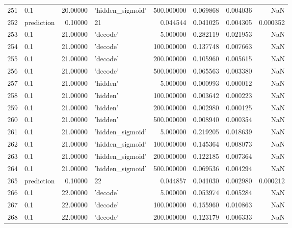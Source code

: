 \documentclass[10pt,a4paper]{article}
\begin{document}
\begin{tabular}{llrlrrrr}
251  &         0.1 &  20.00000 &   'hidden\_sigmoid' &  500.000000 &  0.069868 &  0.004036 &       NaN \\
252  &  prediction &   0.10000 &                 21 &    0.044544 &  0.041025 &  0.004305 &  0.000352 \\
253  &         0.1 &  21.00000 &           'decode' &    5.000000 &  0.282119 &  0.021953 &       NaN \\
254  &         0.1 &  21.00000 &           'decode' &  100.000000 &  0.137748 &  0.007663 &       NaN \\
255  &         0.1 &  21.00000 &           'decode' &  200.000000 &  0.105960 &  0.005615 &       NaN \\
256  &         0.1 &  21.00000 &           'decode' &  500.000000 &  0.065563 &  0.003380 &       NaN \\
257  &         0.1 &  21.00000 &           'hidden' &    5.000000 &  0.000993 &  0.000012 &       NaN \\
258  &         0.1 &  21.00000 &           'hidden' &  100.000000 &  0.003642 &  0.000223 &       NaN \\
259  &         0.1 &  21.00000 &           'hidden' &  200.000000 &  0.002980 &  0.000125 &       NaN \\
260  &         0.1 &  21.00000 &           'hidden' &  500.000000 &  0.008940 &  0.000354 &       NaN \\
261  &         0.1 &  21.00000 &   'hidden\_sigmoid' &    5.000000 &  0.219205 &  0.018639 &       NaN \\
262  &         0.1 &  21.00000 &   'hidden\_sigmoid' &  100.000000 &  0.145364 &  0.008073 &       NaN \\
263  &         0.1 &  21.00000 &   'hidden\_sigmoid' &  200.000000 &  0.122185 &  0.007364 &       NaN \\
264  &         0.1 &  21.00000 &   'hidden\_sigmoid' &  500.000000 &  0.069536 &  0.004294 &       NaN \\
265  &  prediction &   0.10000 &                 22 &    0.044857 &  0.041030 &  0.002980 &  0.000212 \\
266  &         0.1 &  22.00000 &           'decode' &    5.000000 &  0.053974 &  0.005284 &       NaN \\
267  &         0.1 &  22.00000 &           'decode' &  100.000000 &  0.155960 &  0.010863 &       NaN \\
268  &         0.1 &  22.00000 &           'decode' &  200.000000 &  0.123179 &  0.006333 &       NaN \\

\end{tabular}
\end{document}
